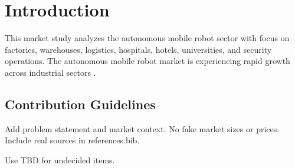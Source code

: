 \chapter{Introduction}

This market study analyzes the autonomous mobile robot sector with focus on factories, warehouses, logistics, hospitals, hotels, universities, and security operations. The autonomous mobile robot market is experiencing rapid growth across industrial sectors \cite{smith2023amr}.

\section{Contribution Guidelines}

Add problem statement and market context. No fake market sizes or prices. Include real sources in references.bib.

Use TBD for undecided items.

